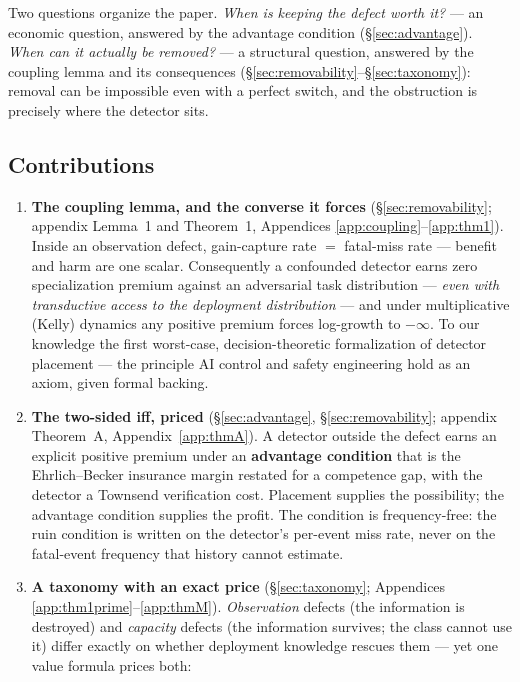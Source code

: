 \documentclass[11pt]{article}
\theoremstyle{plain}
\theoremstyle{definition}
\begin{document}
Two questions organize the paper. \emph{When is keeping the defect worth it?} --- an
economic question, answered by the advantage condition (\S\ref{sec:advantage}). \emph{When can it
actually be removed?} --- a structural question, answered by the coupling lemma
and its consequences (\S\ref{sec:removability}--\S\ref{sec:taxonomy}): removal can be impossible even with a perfect
switch, and the obstruction is precisely where the detector sits.

\subsection*{Contributions}

\begin{enumerate}
\item \textbf{The coupling lemma, and the converse it forces} (\S\ref{sec:removability}; appendix Lemma~1
   and Theorem~1, Appendices \ref{app:coupling}--\ref{app:thm1}). Inside an observation defect, gain-capture rate $=$ fatal-miss
   rate --- benefit and harm are one scalar. Consequently a confounded detector
   earns zero specialization premium against an adversarial task distribution
   --- \emph{even with transductive access to the deployment distribution} --- and
   under multiplicative (Kelly) dynamics any positive premium forces
   log-growth to $-\infty$. To our knowledge the first worst-case,
   decision-theoretic formalization of detector placement --- the principle AI
   control and safety engineering hold as an axiom, given formal backing.
\item \textbf{The two-sided iff, priced} (\S\ref{sec:advantage}, \S\ref{sec:removability}; appendix Theorem~A,
   Appendix~\ref{app:thmA}). A detector outside
   the defect earns an explicit positive premium under an \textbf{advantage
   condition} that is the Ehrlich--Becker insurance margin restated for a
   competence gap, with the detector a Townsend verification cost. Placement
   supplies the possibility; the advantage condition supplies the profit. The
   condition is frequency-free: the ruin condition is written on the
   detector's per-event miss rate, never on the fatal-event frequency that
   history cannot estimate.
\item \textbf{A taxonomy with an exact price} (\S\ref{sec:taxonomy}; Appendices
   \ref{app:thm1prime}--\ref{app:thmM}). \emph{Observation}
   defects (the information is destroyed) and \emph{capacity} defects (the
   information survives; the class cannot use it) differ exactly on whether
   deployment knowledge rescues them --- yet one value formula prices both:

\end{enumerate}
\end{document}
